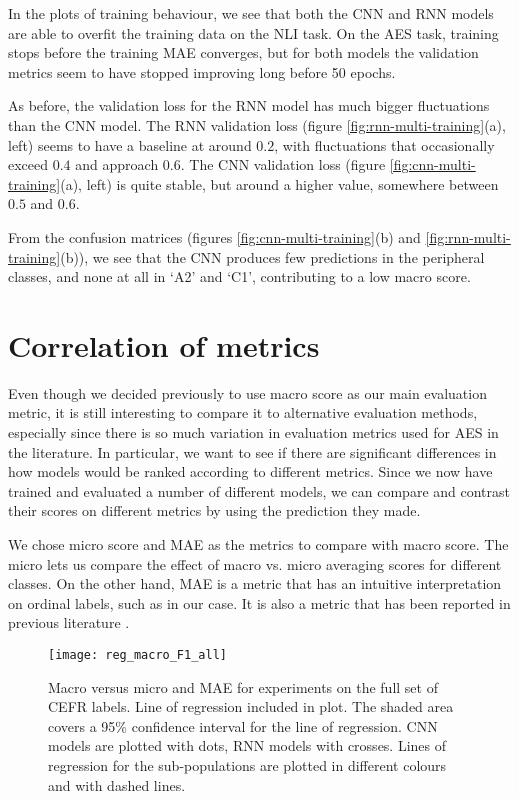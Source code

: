 In the plots of training behaviour, we see that both the CNN and RNN models
are able to overfit the training data on the \ac{NLI} task. On the \ac{AES}
task, training stops before the training \ac{MAE} converges, but for both
models the validation metrics seem to have stopped improving long before 50
epochs.

As before, the validation loss for the RNN model has much bigger fluctuations
than the CNN model. The RNN validation loss (figure
\ref{fig:rnn-multi-training}(a), left) seems to have a baseline at around
$0.2$, with fluctuations that occasionally exceed $0.4$ and approach $0.6$.
The CNN validation loss (figure \ref{fig:cnn-multi-training}(a), left) is
quite stable, but around a higher value, somewhere between $0.5$ and $0.6$.

From the confusion matrices (figures \ref{fig:cnn-multi-training}(b) and
\ref{fig:rnn-multi-training}(b)), we see that the CNN produces few
predictions in the peripheral classes, and none at all in `A2' and `C1',
contributing to a low macro \FI score.


\section{Correlation of metrics}

Even though we decided previously to use macro \FI score as our main
evaluation metric, it is still interesting to compare it to alternative
evaluation methods, especially since there is so much variation in evaluation
metrics used for \ac{AES} in the literature. In particular, we want to see if
there are significant differences in how models would be ranked according to
different metrics. Since we now have trained and evaluated a number of
different models, we can compare and contrast their scores on different
metrics by using the prediction they made.

We chose micro \FI score and \ac{MAE} as the metrics to compare with macro
\FI score. The micro \FI lets us compare the effect of macro vs. micro
averaging scores for different classes. On the other hand, \ac{MAE} is a
metric that has an intuitive interpretation on ordinal labels, such as in our
case. It is also a metric that has been reported in previous literature
\autocite{vajjala17}.

\begin{figure}
  \centering
  \texttt{[image: reg\_macro\_F1\_all]}
  \caption[Macro \FI versus MAE]{
    Macro \FI versus micro \FI and MAE for experiments on the full set of
    CEFR labels. Line of regression included in plot. The shaded area covers
    a 95\% confidence interval for the line of regression. CNN models are
    plotted with dots, RNN models with crosses. Lines of regression for the
    sub-populations are plotted in different colours and with dashed lines.
  }
  \label{fig:reg_macro_F1_all}
\end{figure}

